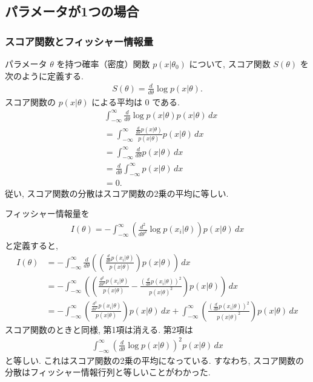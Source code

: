\documentclass{jarticle}
\begin{document}
\subsection{パラメータが1つの場合}

\subsubsection{スコア関数とフィッシャー情報量}
パラメータ $\theta$ を持つ確率（密度）関数 $p(x|\theta_0)$ について, スコア関数 $S(\theta)$ を次のように定義する. 
\begin{align}
S(\theta) = \frac{d}{d\theta}\log p(x | \theta). 
\end{align}
スコア関数の $p(x|\theta)$ による平均は 0 である.  
\begin{align}
&\int_{-\infty}^{\infty} \frac{d}{d\theta}\log p(x | \theta) p(x|\theta)\, dx \\
&= \int_{-\infty}^{\infty} \frac{\frac{d}{d\theta}p(x | \theta)}{p(x | \theta)} p(x|\theta) \, dx \\
&=\int_{-\infty}^{\infty} \frac{d}{d\theta}p(x | \theta)\, dx \\
&=  \frac{d}{d\theta} \int_{-\infty}^{\infty} p(x | \theta)\, dx\\
&= 0.
\end{align}
従い, スコア関数の分散はスコア関数の2乗の平均に等しい.

フィッシャー情報量を
\begin{align}
I(\theta)=-\int^{\infty}_{-\infty}\left(\frac{d^2}{d \theta^2} \log p(x_i | \theta)\right) p(x|\theta) \, dx
\end{align}
と定義すると, 
\begin{align}
I(\theta)&=-\int^{\infty}_{-\infty}\frac{d}{d \theta} \left(\left(\frac{\frac{d}{d\theta} p(x_i | \theta)}{p(x|\theta)}\right) p(x|\theta) \right) \, dx \\
&=-\int^{\infty}_{-\infty}\left(\left(\frac{\frac{d^2}{d\theta^2} p(x_i | \theta)}{p(x|\theta)} - \frac{ ( \frac{d}{d\theta} p(x_i | \theta))^2}{p(x|\theta)^2 }\right) p(x|\theta) \right) \, dx \\
&=-\int^{\infty}_{-\infty}\left(\frac{\frac{d^2}{d\theta^2} p(x_i | \theta)}{p(x|\theta)}\right) p(x|\theta) \, dx +\int^{\infty}_{-\infty}\left( \frac{ ( \frac{d}{d\theta} p(x_i | \theta))^2}{p(x|\theta)^2 }\right) p(x|\theta) \, dx
\end{align}
スコア関数のときと同様, 第1項は消える. 
第2項は
\begin{align}
\int^{\infty}_{-\infty}\left(\frac{d}{d\theta} \log p(x | \theta)\right)^2 p(x|\theta) \, dx 
\end{align}
と等しい. これはスコア関数の2乗の平均になっている. 
すなわち, スコア関数の分散はフィッシャー情報行列と等しいことがわかった. 
\end{document}
